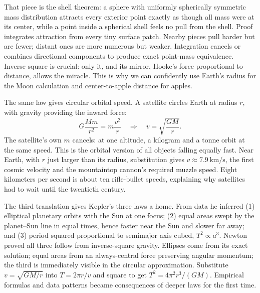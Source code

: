 \begin{mathbridge}
That piece is the shell theorem: a sphere with uniformly spherically symmetric mass distribution attracts every exterior point exactly as though all mass were at its center, while a point inside a spherical shell feels no pull from the shell. Proof integrates attraction from every tiny surface patch. Nearby pieces pull harder but are fewer; distant ones are more numerous but weaker. Integration cancels or combines directional components to produce exact point-mass equivalence. Inverse square is crucial: only it, and its mirror, Hooke's force proportional to distance, allows the miracle. This is why we can confidently use Earth's radius for the Moon calculation and center-to-apple distance for apples.

The same law gives circular orbital speed. A satellite circles Earth at radius \(r\), with gravity providing the inward force:
\[
G\frac{M m}{r^{2}} = m\frac{v^{2}}{r}
\quad\Longrightarrow\quad
v = \sqrt{\frac{GM}{r}}.
\]
The satellite's own \(m\) cancels: at one altitude, a kilogram and a tonne orbit at the same speed. This is the orbital version of all objects falling equally fast. Near Earth, with \(r\) just larger than its radius, substitution gives \(v \approx 7.9\,\mathrm{km/s}\), the first cosmic velocity and the mountaintop cannon's required muzzle speed. Eight kilometers per second is about ten rifle-bullet speeds, explaining why satellites had to wait until the twentieth century.
\end{mathbridge}

The third translation gives Kepler's three laws a home. From data he inferred (1) elliptical planetary orbits with the Sun at one focus; (2) equal areas swept by the planet--Sun line in equal times, hence faster near the Sun and slower far away; and (3) period squared proportional to semimajor axis cubed, \(T^{2} \propto a^{3}\). Newton proved all three follow from inverse-square gravity. Ellipses come from its exact solution; equal areas from an always-central force preserving angular momentum; the third is immediately visible in the circular approximation. Substitute \(v = \sqrt{GM/r}\) into \(T = 2\pi r/v\) and square to get \(T^{2} = 4\pi^{2}r^{3}/(GM)\). Empirical formulas and data patterns became consequences of deeper laws for the first time.

